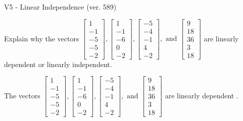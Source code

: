 \begin{exercise}
  \begin{exerciseTitle}V5 - Linear Independence (ver. 589)\end{exerciseTitle}
  \begin{exerciseStatement}
    Explain why the vectors \(\left[\begin{array}{r}
1 \\
-1 \\
-5 \\
-5 \\
-2
\end{array}\right] , \left[\begin{array}{r}
1 \\
-1 \\
-6 \\
0 \\
-2
\end{array}\right] , \left[\begin{array}{r}
-5 \\
-4 \\
-1 \\
4 \\
-2
\end{array}\right] , \text{ and } \left[\begin{array}{r}
9 \\
18 \\
36 \\
3 \\
18
\end{array}\right]\) are linearly dependent or linearly independent.	


  \end{exerciseStatement}
  \begin{exerciseAnswer}
   The vectors \(\left[\begin{array}{r}
1 \\
-1 \\
-5 \\
-5 \\
-2
\end{array}\right] , \left[\begin{array}{r}
1 \\
-1 \\
-6 \\
0 \\
-2
\end{array}\right] , \left[\begin{array}{r}
-5 \\
-4 \\
-1 \\
4 \\
-2
\end{array}\right] , \text{ and } \left[\begin{array}{r}
9 \\
18 \\
36 \\
3 \\
18
\end{array}\right]\) are 
  	 linearly dependent  .
  


  \end{exerciseAnswer}
\end{exercise}